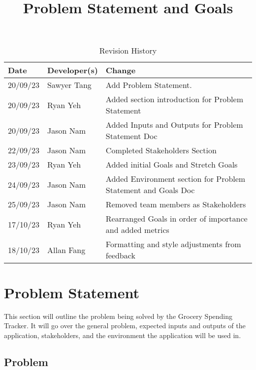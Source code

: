 \documentclass{article}
\title{Problem Statement and Goals\\\progname}
\author{\authname}
\date{}
\begin{document}
\maketitle

\begin{table}[hp]
\caption{Revision History} \label{TblRevisionHistory}
\begin{tabularx}{\textwidth}{llX}
\toprule
\textbf{Date} & \textbf{Developer(s)} & \textbf{Change}\\
\midrule
20/09/23 & Sawyer Tang & Add Problem Statement.\\
20/09/23 & Ryan Yeh & Added section introduction for Problem Statement\\
20/09/23 & Jason Nam & Added Inputs and Outputs for Problem Statement Doc\\
22/09/23 & Jason Nam & Completed Stakeholders Section\\
23/09/23 & Ryan Yeh & Added initial Goals and Stretch Goals\\
24/09/23 & Jason Nam & Added Environment section for Problem Statement and Goals Doc\\
25/09/23 & Jason Nam & Removed team members as Stakeholders\\
17/10/23 & Ryan Yeh & Rearranged Goals in order of importance and added metrics\\
18/10/23 & Allan Fang & Formatting and style adjustments from feedback\\
\bottomrule
\end{tabularx}
\end{table}

\section{Problem Statement}


This section will outline the problem being solved by the Grocery Spending Tracker. It will go
over the general problem, expected inputs and outputs of the application, stakeholders, and the environment
the application will be used in.

\subsection{Problem}
\end{document}
